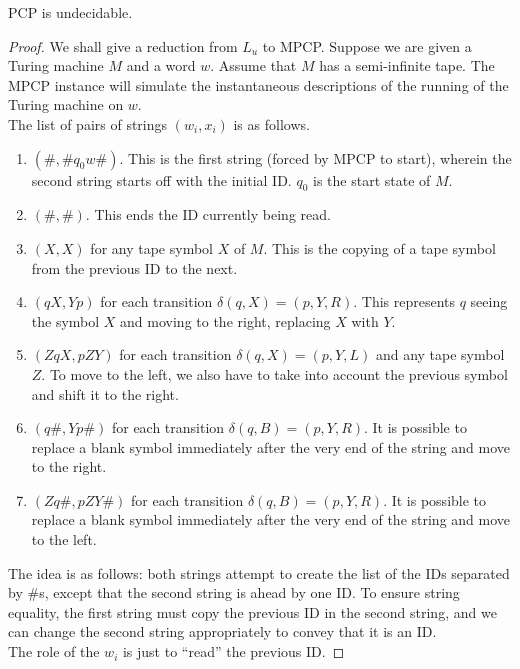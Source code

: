 	\begin{ftheo}
		PCP is undecidable.
	\end{ftheo}
	\begin{proof}
		We shall give a reduction from $L_u$ to MPCP. Suppose we are given a Turing machine $M$ and a word $w$. Assume that $M$ has a semi-infinite tape. The MPCP instance will simulate the instantaneous descriptions of the running of the Turing machine on $w$.\\
		The list of pairs of strings $(w_i,x_i)$ is as follows.
		\begin{enumerate}
			\item $(\#,\#q_0w\#)$. This is the first string (forced by MPCP to start), wherein the second string starts off with the initial ID. $q_0$ is the start state of $M$.
			\item $(\#,\#)$. This ends the ID currently being read.
			\item $(X,X)$ for any tape symbol $X$ of $M$. This is the copying of a tape symbol from the previous ID to the next.
			\item $(qX,Yp)$ for each transition $\delta(q,X) = (p,Y,R)$. This represents $q$ seeing the symbol $X$ and moving to the right, replacing $X$ with $Y$.
			\item $(ZqX,pZY)$ for each transition $\delta(q,X) = (p,Y,L)$ and any tape symbol $Z$. To move to the left, we also have to take into account the previous symbol and shift it to the right.
			\item $(q\#,Yp\#)$ for each transition $\delta(q,B) = (p,Y,R)$. It is possible to replace a blank symbol immediately after the very end of the string and move to the right.
			\item $(Zq\#,pZY\#)$ for each transition $\delta(q,B) = (p,Y,R)$. It is possible to replace a blank symbol immediately after the very end of the string and move to the left.
		\end{enumerate}
		The idea is as follows: both strings attempt to create the list of the IDs separated by $\#$s, except that the second string is ahead by one ID. To ensure string equality, the first string must copy the previous ID in the second string, and we can change the second string appropriately to convey that it is an ID.\\
		The role of the $w_i$ is just to ``read'' the previous ID.
	\end{proof}